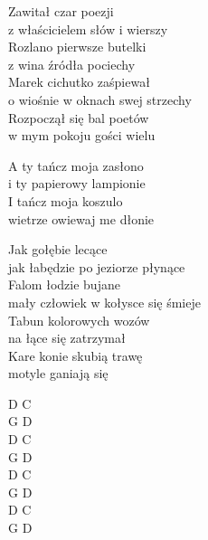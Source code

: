 \begin{text}
    Zawitał czar poezji\\
    z właścicielem słów i wierszy\\
    Rozlano pierwsze butelki\\
    z wina źródła pociechy\\
    Marek cichutko zaśpiewał\\
    o wiośnie w oknach swej strzechy\\
    Rozpoczął się bal poetów\\
    w mym pokoju gości wielu

    A ty tańcz moja zasłono\\
    i ty papierowy lampionie\\
    I tańcz moja koszulo\\
    wietrze owiewaj me dłonie

    Jak gołębie lecące\\
    jak łabędzie po jeziorze płynące\\
    Falom łodzie bujane\\
    mały człowiek w kołysce się śmieje\\
    Tabun kolorowych wozów\\
    na łące się zatrzymał\\
    Kare konie skubią trawę\\
    motyle ganiają się
\end{text}
\begin{chord}
    D C\\
    G D\\
    D C\\
    G D\\
    D C\\
    G D\\
    D C\\
    G D
\end{chord}